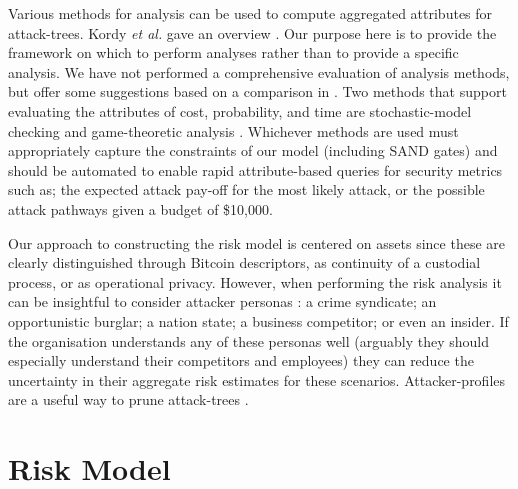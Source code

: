 \documentclass[runningheads]{llncs}
\begin{document}
Various methods for analysis can be used to compute aggregated attributes for attack-trees. Kordy \textit{et al.} gave an overview \cite{KordyReview}. Our purpose here is to provide the framework on which to perform analyses rather than to provide a specific analysis. We have not performed a comprehensive evaluation of analysis methods, but offer some suggestions based on a comparison in \cite{KumarThesis}. Two methods that support evaluating the attributes of cost, probability, and time are stochastic-model checking \cite{AFTrees} and game-theoretic analysis \cite{ADTreeValue}. Whichever methods are used must appropriately capture the constraints of our model (including SAND gates) and should be automated to enable rapid attribute-based queries for security metrics such as; the expected attack pay-off for the most likely attack,  or the possible attack pathways given a budget of \$10,000.   

Our approach to constructing the risk model is centered on assets since these are clearly distinguished through Bitcoin descriptors, as continuity of a custodial process, or as operational privacy. However, when performing the risk analysis it can be insightful to consider attacker personas \cite{Shostack}:  a crime syndicate; an opportunistic burglar; a nation state; a business competitor; or even an insider. If the organisation understands any of these personas well (arguably they should especially understand their competitors and employees) they can reduce the uncertainty in their aggregate risk estimates for these scenarios. Attacker-profiles are a useful way to prune attack-trees \cite{KumarThesis}.
  

\section{Risk Model}
\label{sec:Threat Model}
\end{document}
